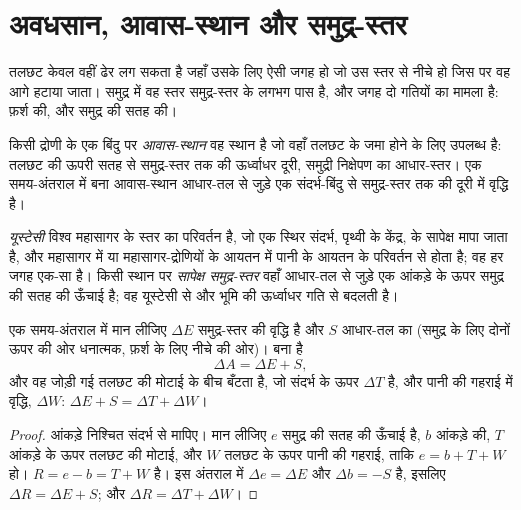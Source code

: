 \section{अवधसान, आवास-स्थान और समुद्र-स्तर}\label{sec:b1:diagenesis-basins:accommodation}

तलछट केवल वहीं ढेर लग सकता है जहाँ उसके लिए ऐसी जगह हो जो उस स्तर से नीचे हो जिस पर वह आगे हटाया जाता। समुद्र में वह स्तर समुद्र-स्तर के लगभग पास है, और जगह दो गतियों का मामला है: फ़र्श की, और समुद्र की सतह की।

\begin{definition}[आवास-स्थान]\label{def:b1:diagenesis-basins:accommodation}
किसी द्रोणी के एक बिंदु पर \emph{आवास-स्थान} वह स्थान है जो वहाँ तलछट के जमा होने के लिए उपलब्ध है: तलछट की ऊपरी सतह से समुद्र-स्तर तक की ऊर्ध्वाधर दूरी, समुद्री निक्षेपण का आधार-स्तर। एक समय-अंतराल में बना आवास-स्थान आधार-तल से जुड़े एक संदर्भ-बिंदु से समुद्र-स्तर तक की दूरी में वृद्धि है।
\end{definition}

\begin{definition}[यूस्टेसी, सापेक्ष समुद्र-स्तर]\label{def:b1:diagenesis-basins:eustasy}
\emph{यूस्टेसी} विश्व महासागर के स्तर का परिवर्तन है, जो एक स्थिर संदर्भ, पृथ्वी के केंद्र, के सापेक्ष मापा जाता है, और महासागर में या महासागर-द्रोणियों के आयतन में पानी के आयतन के परिवर्तन से होता है; वह हर जगह एक-सा है। किसी स्थान पर \emph{सापेक्ष समुद्र-स्तर} वहाँ आधार-तल से जुड़े एक आंकड़े के ऊपर समुद्र की सतह की ऊँचाई है; वह यूस्टेसी से और भूमि की ऊर्ध्वाधर गति से बदलती है।
\end{definition}

\begin{proposition}[आवास-स्थान का बजट]\label{prop:b1:diagenesis-basins:budget}
एक समय-अंतराल में मान लीजिए $\Delta E$ समुद्र-स्तर की  वृद्धि है और $S$ आधार-तल का  (समुद्र के लिए दोनों ऊपर की ओर धनात्मक, फ़र्श के लिए नीचे की ओर)। बना  है
\[
  \Delta A = \Delta E + S ,
\]
और वह जोड़ी गई तलछट की मोटाई के बीच बँटता है, जो संदर्भ के ऊपर $\Delta T$ है, और पानी की गहराई में वृद्धि, $\Delta W$: $\Delta E + S = \Delta T + \Delta W$।
\end{proposition}

\begin{proof}
आंकड़े निश्चित संदर्भ से मापिए। मान लीजिए $e$ समुद्र की सतह की ऊँचाई है, $b$ आंकड़े की, $T$ आंकड़े के ऊपर तलछट की मोटाई, और $W$ तलछट के ऊपर पानी की गहराई, ताकि $e = b + T + W$ हो।
 $R = e - b = T + W$ है। इस अंतराल में $\Delta e =
\Delta E$ और $\Delta b = -S$ है, इसलिए $\Delta R = \Delta E + S$; और $\Delta R =
\Delta T + \Delta W$।
\end{proof}

